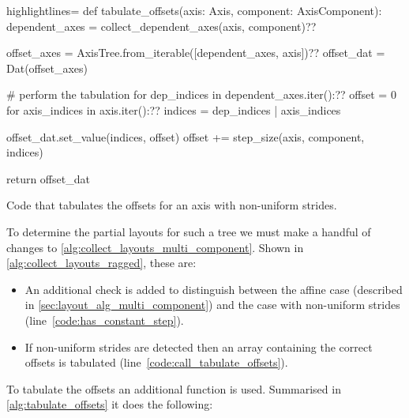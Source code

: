 \documentclass[thesis]{subfiles}
\begin{document}
\begin{algorithm}
  \begin{center}
    \begin{minipage}{.9\textwidth}
      \begin{pyalg2*}{highlightlines={}}
        def tabulate_offsets(axis: Axis, component: AxisComponent):
          dependent_axes = collect_dependent_axes(axis, component)?\label{code:collect_dependent_axes}?

          offset_axes = AxisTree.from_iterable([dependent_axes, axis])?\label{code:offset_axes}?
          offset_dat = Dat(offset_axes\label{code:offset_dat})

          # perform the tabulation
          for dep_indices in dependent_axes.iter():?\label{code:loop_dependent_axes}?
            offset = 0
            for axis_indices in axis.iter():?\label{code:loop_current_axis}?
              indices = dep_indices | axis_indices

              offset_dat.set_value(indices, offset)
              offset += step_size(axis, component, indices)

          return offset_dat
      \end{pyalg2*}
    \end{minipage}
  \end{center}

  \caption{
    Code that tabulates the offsets for an axis with non-uniform strides.
  }
  \label{alg:tabulate_offsets}
\end{algorithm}

To determine the partial layouts for such a tree we must make a handful of changes to \cref{alg:collect_layouts_multi_component}.
Shown in \cref{alg:collect_layouts_ragged}, these are:

\begin{itemize}
  \item
    An additional check is added to distinguish between the affine case (described in \cref{sec:layout_alg_multi_component}) and the case with non-uniform strides (line~\ref{code:has_constant_step}).

  \item
    If non-uniform strides are detected then an array containing the correct offsets is tabulated (line~\ref{code:call_tabulate_offsets}).
\end{itemize}

To tabulate the offsets an additional function  is used.
Summarised in \cref{alg:tabulate_offsets} it does the following:
\end{document}
